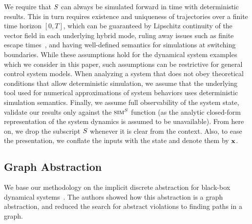  We require that $S$ can always be
simulated forward in time with deterministic results. This in turn
requires existence and uniqueness of trajectories over a finite time
horizon $[0,T]$, which can be guaranteed by Lipschitz continuity of
the vector field in each underlying hybrid mode, ruling away issues
such as finite escape times~\cite{Meiss/2007/Differential}, and having
well-defined semantics for simulations at switching boundaries. While
these assumptions hold for the dynamical system examples which we
consider in this paper, such assumptions can be restrictive for
general control system models. When analyzing a system that does not
obey theoretical conditions that allow deterministic simulation, we
assume that the underlying tool used for numerical approximations of
system behaviors uses deterministic simulation semantics.  Finally, we
assume full observability of the system state, validate our results
only against the $\mbox{\sc sim}^{S}$ function (as the analytic closed-form
representation of the system dynamics is assumed to be unavailable).
From here on, we drop the subscript $S$ whenever it is clear
from the context. Also, to ease the presentation, we conflate the
inputs with the state and denote them by $\mathbf{x}$.

\subsection{Graph Abstraction}

We base our methodology on the implicit discrete abstraction for
black-box dynamical systems~\cite{zutshi2014multiple}. The authors
showed how this abstraction is a graph abstraction, and reduced the
search for abstract violations to finding paths in a graph.


